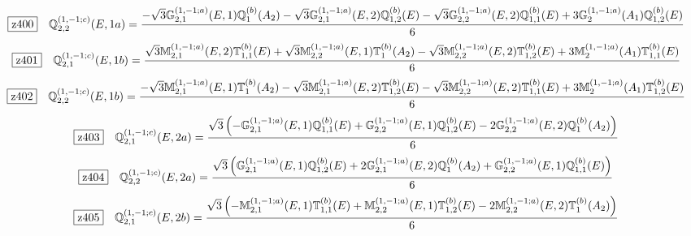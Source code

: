 \documentclass[fleqn,10pt,landscape]{jsarticle}
\begin{document}
\begin{dmath*}
\hspace*{3mm}\fbox{z400}\quad \mathbb{Q}_{2,2}^{(1,-1;c)}(E,1a)=\frac{- \sqrt{3} \mathbb{G}_{2,1}^{(1,-1;a)}(E,1) \mathbb{Q}_{1}^{(b)}(A_{2}) - \sqrt{3} \mathbb{G}_{2,1}^{(1,-1;a)}(E,2) \mathbb{Q}_{1,2}^{(b)}(E) - \sqrt{3} \mathbb{G}_{2,2}^{(1,-1;a)}(E,2) \mathbb{Q}_{1,1}^{(b)}(E) + 3 \mathbb{G}_{2}^{(1,-1;a)}(A_{1}) \mathbb{Q}_{1,2}^{(b)}(E)}{6}
\end{dmath*}
\begin{dmath*}
\hspace*{3mm}\fbox{z401}\quad \mathbb{Q}_{2,1}^{(1,-1;c)}(E,1b)=\frac{\sqrt{3} \mathbb{M}_{2,1}^{(1,-1;a)}(E,2) \mathbb{T}_{1,1}^{(b)}(E) + \sqrt{3} \mathbb{M}_{2,2}^{(1,-1;a)}(E,1) \mathbb{T}_{1}^{(b)}(A_{2}) - \sqrt{3} \mathbb{M}_{2,2}^{(1,-1;a)}(E,2) \mathbb{T}_{1,2}^{(b)}(E) + 3 \mathbb{M}_{2}^{(1,-1;a)}(A_{1}) \mathbb{T}_{1,1}^{(b)}(E)}{6}
\end{dmath*}
\begin{dmath*}
\hspace*{3mm}\fbox{z402}\quad \mathbb{Q}_{2,2}^{(1,-1;c)}(E,1b)=\frac{- \sqrt{3} \mathbb{M}_{2,1}^{(1,-1;a)}(E,1) \mathbb{T}_{1}^{(b)}(A_{2}) - \sqrt{3} \mathbb{M}_{2,1}^{(1,-1;a)}(E,2) \mathbb{T}_{1,2}^{(b)}(E) - \sqrt{3} \mathbb{M}_{2,2}^{(1,-1;a)}(E,2) \mathbb{T}_{1,1}^{(b)}(E) + 3 \mathbb{M}_{2}^{(1,-1;a)}(A_{1}) \mathbb{T}_{1,2}^{(b)}(E)}{6}
\end{dmath*}
\begin{dmath*}
\hspace*{3mm}\fbox{z403}\quad \mathbb{Q}_{2,1}^{(1,-1;c)}(E,2a)=\frac{\sqrt{3} \left(- \mathbb{G}_{2,1}^{(1,-1;a)}(E,1) \mathbb{Q}_{1,1}^{(b)}(E) + \mathbb{G}_{2,2}^{(1,-1;a)}(E,1) \mathbb{Q}_{1,2}^{(b)}(E) - 2 \mathbb{G}_{2,2}^{(1,-1;a)}(E,2) \mathbb{Q}_{1}^{(b)}(A_{2})\right)}{6}
\end{dmath*}
\begin{dmath*}
\hspace*{3mm}\fbox{z404}\quad \mathbb{Q}_{2,2}^{(1,-1;c)}(E,2a)=\frac{\sqrt{3} \left(\mathbb{G}_{2,1}^{(1,-1;a)}(E,1) \mathbb{Q}_{1,2}^{(b)}(E) + 2 \mathbb{G}_{2,1}^{(1,-1;a)}(E,2) \mathbb{Q}_{1}^{(b)}(A_{2}) + \mathbb{G}_{2,2}^{(1,-1;a)}(E,1) \mathbb{Q}_{1,1}^{(b)}(E)\right)}{6}
\end{dmath*}
\begin{dmath*}
\hspace*{3mm}\fbox{z405}\quad \mathbb{Q}_{2,1}^{(1,-1;c)}(E,2b)=\frac{\sqrt{3} \left(- \mathbb{M}_{2,1}^{(1,-1;a)}(E,1) \mathbb{T}_{1,1}^{(b)}(E) + \mathbb{M}_{2,2}^{(1,-1;a)}(E,1) \mathbb{T}_{1,2}^{(b)}(E) - 2 \mathbb{M}_{2,2}^{(1,-1;a)}(E,2) \mathbb{T}_{1}^{(b)}(A_{2})\right)}{6}
\end{dmath*}
\end{document}
